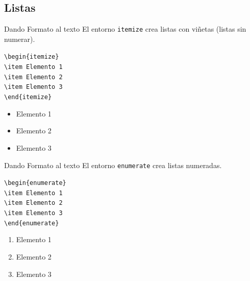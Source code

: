 \documentclass[12pt]{beamer}
\begin{document}
\subsection{Listas}
\begin{frame}{Dando Formato al texto}
  El entorno {\color{blue}\texttt{itemize}} crea listas con viñetas (listas sin numerar).
  \begin{center}
    \begin{minipage}{0.5\textwidth} 
  \begin{block}{}
    \texttt{\textbackslash begin\{itemize\}\\
      \textbackslash item Elemento 1\\
      \textbackslash item Elemento 2\\
      \textbackslash item Elemento 3\\
    \textbackslash end\{itemize\}}
  \end{block}
  \end{minipage}
  \end{center}
  \begin{itemize}
    \item Elemento 1
    \item Elemento 2
    \item Elemento 3
  \end{itemize}
\end{frame}
\begin{frame}{Dando Formato al texto}
  El entorno {\color{blue}\texttt{enumerate}} crea listas numeradas.
  \begin{center}
    \begin{minipage}{0.5\textwidth} 
  \begin{block}{}
    \texttt{\textbackslash begin\{enumerate\}\\
      \textbackslash item Elemento 1\\
      \textbackslash item Elemento 2\\
      \textbackslash item Elemento 3\\
    \textbackslash end\{enumerate\}}
  \end{block}
  \end{minipage}
  \end{center}
  \begin{enumerate}
    \item Elemento 1
    \item Elemento 2
    \item Elemento 3
  \end{enumerate}
\end{frame}
\end{document}

